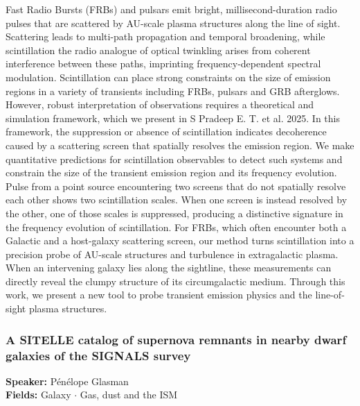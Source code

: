 Fast Radio Bursts (FRBs) and pulsars emit bright, millisecond-duration radio pulses that are scattered by AU-scale plasma structures along the line of sight. Scattering leads to multi-path propagation and temporal broadening, while scintillation the radio analogue of optical twinkling arises from coherent interference between these paths, imprinting frequency-dependent spectral modulation. Scintillation can place strong constraints on the size of emission regions in a variety of transients including FRBs, pulsars and GRB afterglows. However, robust interpretation of observations requires a theoretical and simulation framework, which we present in S Pradeep E. T. et al. 2025. In this framework, the suppression or absence of scintillation indicates decoherence caused by a scattering screen that spatially resolves the emission region. We make quantitative predictions for scintillation observables to detect such systems and constrain the size of the transient emission region and its frequency evolution. Pulse from a point source encountering two screens that do not spatially resolve each other shows two scintillation scales. When one screen is instead resolved by the other, one of those scales is suppressed, producing a distinctive signature in the frequency evolution of scintillation. For FRBs, which often encounter both a Galactic and a host-galaxy scattering screen, our method turns scintillation into a precision probe of AU-scale structures and turbulence in extragalactic plasma. When an intervening galaxy lies along the sightline, these measurements can directly reveal the clumpy structure of its circumgalactic medium. Through this work, we present a new tool to probe transient emission physics and the line-of-sight plasma structures.

\hypertarget{abstract-talk-101}{}\label{abstract-page-talk-101}
\subsubsection*{A SITELLE catalog of supernova remnants in nearby dwarf galaxies of the SIGNALS survey}
\textbf{Speaker:} Pénélope Glasman\\
\textbf{Fields:} Galaxy $\cdot$ Gas, dust and the ISM

